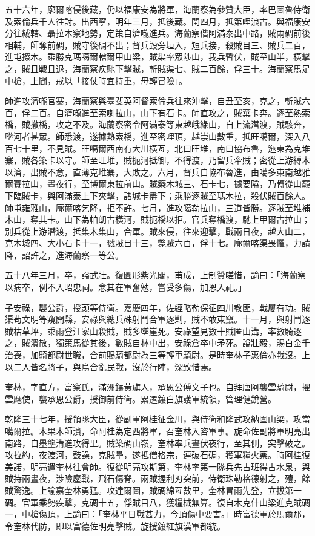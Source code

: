 \begin{pinyinscope}
五十六年，廓爾喀侵後藏，仍以福康安為將軍，海蘭察為參贊大臣，率巴圖魯侍衛及索倫兵千人往討。出西寧，明年三月，抵後藏。閏四月，抵第哩浪古。與福康安分往絨轄、聶拉木察地勢，定策自濟嚨進兵。海蘭察偕阿滿泰出中路，賊兩碉前後相輔，師奪前碉，賊守後碉不出；督兵毀旁垣入，短兵接，殺賊目三、賊兵二百，進屯擦木。乘勝克瑪噶爾轄爾甲山梁，賊渠率眾陟山，我兵暫伏，賊至山半，橫擊之，賊且戰且退，海蘭察疾馳下擊賊，斬賊渠七、賊二百餘，俘三十。海蘭察馬足中槍，上聞，戒以「接仗時宜持重，毋輕冒險」。

師進攻濟嚨官寨，海蘭察與臺斐英阿督索倫兵往來沖擊，自丑至亥，克之，斬賊六百，俘二百。自濟嚨進至索喇拉山，山下有石卡。師直攻之，賊棄卡奔。逐至熱索橋，賊撤橋，攻之不及。海蘭察密令阿滿泰等東越峨綠山，自上流潛渡，賊駭奔，墜河者甚眾。師悉渡，遂據熱索橋，進至密哩頂，越崇山數重，抵旺噶爾，深入八百七十里，不見賊。旺噶爾西南有大川橫亙，北曰旺堆，南曰協布魯，迤東為克堆寨，賊各築卡以守。師至旺堆，賊扼河抵御，不得渡，乃留兵牽賊；密從上游縛木以濟，出賊不意，直薄克堆寨，大敗之。六月，督兵自協布魯進，由噶多東南越雅爾賽拉山，晝夜行，至博爾東拉前山。賊築木城三、石卡七，據要隘，乃轉從山巔下臨賊卡，與阿滿泰上下夾擊，諸城卡盡下；乘勝逐賊至瑪木拉，殺伏賊百餘人。師屯雍雅山，廓爾喀乞降，拒不許。七月，進攻噶勒拉山，三道皆勝。逐賊至堆補木山，奪其卡。山下為帕朗古橫河，賊扼橋以拒。官兵奪橋渡，馳上甲爾古拉山；別兵從上游潛渡，抵集木集山，合軍。賊來侵，往來迎擊，戰兩日夜，越大山二，克木城四、大小石卡十一，戮賊目十三，斃賊六百，俘十七。廓爾喀渠畏懼，力請降，詔許之，進海蘭察一等公。

五十八年三月，卒，謚武壯。復圖形紫光閣，甫成，上制贊嗟惜，諭曰：「海蘭察以病卒，例不入昭忠祠。念其在軍奮勉，嘗受多傷，加恩入祀。」

子安祿，襲公爵，授頭等侍衛。嘉慶四年，佐經略勒保征四川教匪，戰屢有功。賊渠茍文明等窺開縣，安祿與總兵硃射鬥合軍逐剿，賊不敢東竄。十一月，與射鬥逐賊枯草坪，乘雨登汪家山殺賊，賊多墜崖死。安祿望見數十賊匿山溝，率數騎逐之，賊潰散，獨策馬從其後，數賊自林中出，安祿倉卒中矛死。謚壯毅，賜白金千治喪，加騎都尉世職，合前賜騎都尉為三等輕車騎尉。是時奎林子惠倫亦戰沒。上以二人皆名將子，與烏合亂民戰，沒於行陣，深致惜焉。

奎林，字直方，富察氏，滿洲鑲黃旗人，承恩公傅文子也。自拜唐阿襲雲騎尉，擢雲麾使，襲承恩公爵，授御前侍衛。累遷鑲白旗護軍統領，管理健銳營。

乾隆三十七年，授領隊大臣，從副軍阿桂征金川，與侍衛和隆武攻納圍山梁，攻當噶爾拉。木果木師潰，命阿桂為定西將軍，召奎林入咨軍事。旋命佐副將軍明亮出南路，自墨壟溝進攻得里。賊築碉山嶺，奎林率兵晝伏夜行，至其側，突擊破之。攻拉約，夜渡河，鼓譟，克賊壘，遂抵僧格宗，連破石碉，獲軍糧火藥。時阿桂復美諾，明亮遣奎林往會師。復從明亮攻斯第，奎林率第一隊兵先占班得古水泉，與賊持兩晝夜，涉險鏖戰，飛石傷脊。兩賊握利刃突前，侍衛珠勒格德射之，殪，餘賊驚逸。上諭嘉奎林勇猛。攻達爾圖，賊碉綿亙數里，奎林冒雨先登，立拔第一碉。官軍乘勢疾擊，克碉十五，俘賊目八，獲糧械無算。復自木克什山梁進克賊碉一，中槍傷頂，上諭曰：「奎林平日戰甚力，今頂傷中要害。」時富德軍於馬爾那，令奎林代防，即以富德佐明亮擊賊。旋授鑲紅旗漢軍都統。


\end{pinyinscope}
